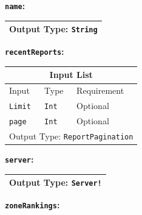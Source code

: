 \documentclass[10pt, a4paper]{memoir}
\numberwithin{equation}{section}
\theoremstyle{plain}
\theoremstyle{defp}
\theoremstyle{dotless}
\theoremstyle{definition}
\theoremstyle{dotless}
\theoremstyle{dotless}
\theoremstyle{defp}
\theoremstyle{defp}
\theoremstyle{be}          %
\theoremstyle{defp}
\newcommand\ttt[1]{\texttt{#1}}
\begin{document}
\medskip

\textbf{\ttt{name}:}

\begin{table}[h!]
	\centering
	\begin{tabular}{ |p{3cm}|p{3cm}|p{3cm}|  }
		\hline
		\multicolumn{3}{|c|}{Output Type: \ttt{String}} \\
		\hline
	\end{tabular}
\end{table}

\medskip

\textbf{\ttt{recentReports}:}

\begin{table}[h!]
	\centering
	\begin{tabular}{ |p{4.2cm}|p{6cm}|p{3cm}|  }
		\hline
		\multicolumn{3}{|c|}{Input List} \\
		\hline
		Input & Type & Requirement\\
		\hline
		\ttt{Limit} & \ttt{Int} & Optional\\
		\ttt{page} & \ttt{Int} & Optional\\
		\hline
		\multicolumn{3}{|c|}{Output Type: \ttt{ReportPagination}} \\
		\hline
	\end{tabular}
\end{table}

\medskip

\textbf{\ttt{server}:}

\begin{table}[h!]
	\centering
	\begin{tabular}{ |p{3cm}|p{3cm}|p{3cm}|  }
		\hline
		\multicolumn{3}{|c|}{Output Type: \ttt{Server!}} \\
		\hline
	\end{tabular}
\end{table}

\medskip

\textbf{\ttt{zoneRankings}:}
\end{document}
